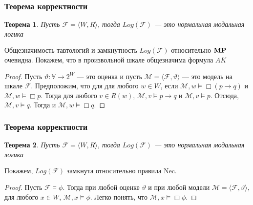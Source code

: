\documentclass[pdf,utf8,russian,aspectratio=169]{beamer}
\newtheorem{theor}{Теорема}
\begin{document}
\begin{frame}
  \frametitle{Теорема корректности}

  \begin{theor}
    Пусть $\mathcal{F} = \langle W, R \rangle$, тогда $Log(\mathcal{F})$ --- это нормальная модальная логика
  \end{theor}

Общезначимость тавтологий и замкнутность $Log(\mathcal{F})$ относительно ${\bf MP}$ очевидна.
Покажем, что в произвольной шкале общезначима формула ${A K}$

  \begin{proof}
    Пусть $\vartheta : \mathbb{V} \to 2^W$ --- это оценка и пусть
    $\mathcal{M} = \langle \mathcal{F}, \vartheta \rangle$ --- это модель на шкале $\mathcal{F}$. Предположим, что для
    для любого $w \in W$, если $\mathcal{M}, w \models \Box (p \to q)$ и $\mathcal{M}, w \models \Box p$.
    Тогда для любого $v \in R(w)$, $\mathcal{M}, v \models p \to q$ и $\mathcal{M}, v \models p$. Отсюда,
    $\mathcal{M}, v \models q$. Тогда и $\mathcal{M}, w \models \Box q$.
  \end{proof}
\end{frame}

\begin{frame}
  \frametitle{Теорема корректности}

  \begin{theor}
    Пусть $\mathcal{F} = \langle W, R \rangle$, тогда $Log(\mathcal{F})$ --- это нормальная модальная логика
  \end{theor}

Покажем, $Log(\mathcal{F})$ замкнута относительно правила Nec.

\begin{proof}
  Пусть $\mathcal{F} \models \phi$. Тогда при любой оценке $\vartheta$ и при любой модели $\mathcal{M} = \langle \mathcal{F}, \vartheta \rangle$, для любого $x \in W$, $\mathcal{M}, x \models \phi$. Легко понять, что $\mathcal{M}, x \models \Box \phi$.
\end{proof}
\end{frame}
\end{document}
